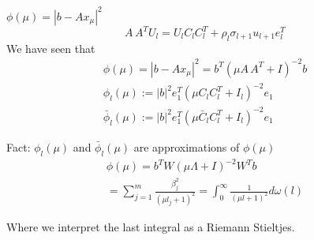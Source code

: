 $\phi(\mu) = |b- Ax_\mu|^2$ 
$$ A\, A^T U_l = U_l C_l C_l^T + \rho_l \sigma_{l+1} u_{l+1} e_l^T$$
We have seen that 
\begin{gather*}
\phi(\mu) = |b-Ax_\mu|^2 = b^T (\mu A\, A^T + I)^{-2} b\\
\phi_l(\mu) := |b|^2 e_1^T (\mu C_l C_l^T + I_l )^{-2} e_1\\
\bar \phi_l(\mu) := |b|^2 e_1^T (\mu \bar C_l C_l^T + I_l )^{-2} e_1
\end{gather*}
\begin{remarks}
Fact: $\phi_l(\mu) $ and $\bar \phi_l(\mu)$ are approximations of $\phi(\mu)$
\begin{gather*}
\phi(\mu) = b^T W (\mu \Lambda  + I)^{-2} W^T b\\
= \sum_{j=1}^m \frac{\beta_j^2}{(\mu l_j + 1)^2 } = \int_0^\infty \frac{1}{(\mu l + 1)^2 } d\omega(l)
\end{gather*}
\end{remarks}
Where we interpret the last integral as a Riemann Stieltjes.
